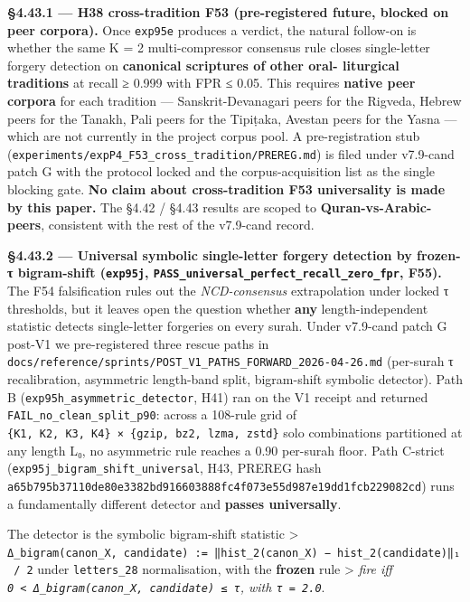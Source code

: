 \documentclass[
]{article}
\begin{document}
\textbf{§4.43.1 --- H38 cross-tradition F53 (pre-registered future,
blocked on peer corpora).} Once \texttt{exp95e} produces a verdict, the
natural follow-on is whether the same K = 2 multi-compressor consensus
rule closes single-letter forgery detection on \textbf{canonical
scriptures of other oral- liturgical traditions} at recall ≥ 0.999 with
FPR ≤ 0.05. This requires \textbf{native peer corpora} for each
tradition --- Sanskrit-Devanagari peers for the Rigveda, Hebrew peers
for the Tanakh, Pali peers for the Tipiṭaka, Avestan peers for the Yasna
--- which are not currently in the project corpus pool. A
pre-registration stub
(\texttt{experiments/expP4\_F53\_cross\_tradition/PREREG.md}) is filed
under v7.9-cand patch G with the protocol locked and the
corpus-acquisition list as the single blocking gate. \textbf{No claim
about cross-tradition F53 universality is made by this paper.} The §4.42
/ §4.43 results are scoped to \textbf{Quran-vs-Arabic-peers}, consistent
with the rest of the v7.9-cand record.

\textbf{§4.43.2 --- Universal symbolic single-letter forgery detection
by frozen-τ bigram-shift (\texttt{exp95j},
\texttt{PASS\_universal\_perfect\_recall\_zero\_fpr}, F55).} The F54
falsification rules out the \emph{NCD-consensus} extrapolation under
locked τ thresholds, but it leaves open the question whether
\textbf{any} length-independent statistic detects single-letter
forgeries on every surah. Under v7.9-cand patch G post-V1 we
pre-registered three rescue paths in
\texttt{docs/reference/sprints/POST\_V1\_PATHS\_FORWARD\_2026-04-26.md}
(per-surah τ recalibration, asymmetric length-band split, bigram-shift
symbolic detector). Path B (\texttt{exp95h\_asymmetric\_detector}, H41)
ran on the V1 receipt and returned \texttt{FAIL\_no\_clean\_split\_p90}:
across a 108-rule grid of
\texttt{\{K1,\ K2,\ K3,\ K4\}\ ×\ \{gzip,\ bz2,\ lzma,\ zstd\}} solo
combinations partitioned at any length L₀, no asymmetric rule reaches a
0.90 per-surah floor. Path C-strict
(\texttt{exp95j\_bigram\_shift\_universal}, H43, PREREG hash
\texttt{a65b795b37110de80e3382bd916603888fc4f073e55d987e19dd1fcb229082cd})
runs a fundamentally different detector and \textbf{passes universally}.

The detector is the symbolic bigram-shift statistic \textgreater{}
\texttt{Δ\_bigram(canon\_X,\ candidate)\ :=\ ‖hist\_2(canon\_X)\ −\ hist\_2(candidate)‖₁\ /\ 2}
under \texttt{letters\_28} normalisation, with the \textbf{frozen} rule
\textgreater{} \emph{fire iff
\texttt{0\ \textless{}\ Δ\_bigram(canon\_X,\ candidate)\ ≤\ τ}, with
\texttt{τ\ =\ 2.0}}.
\end{document}
